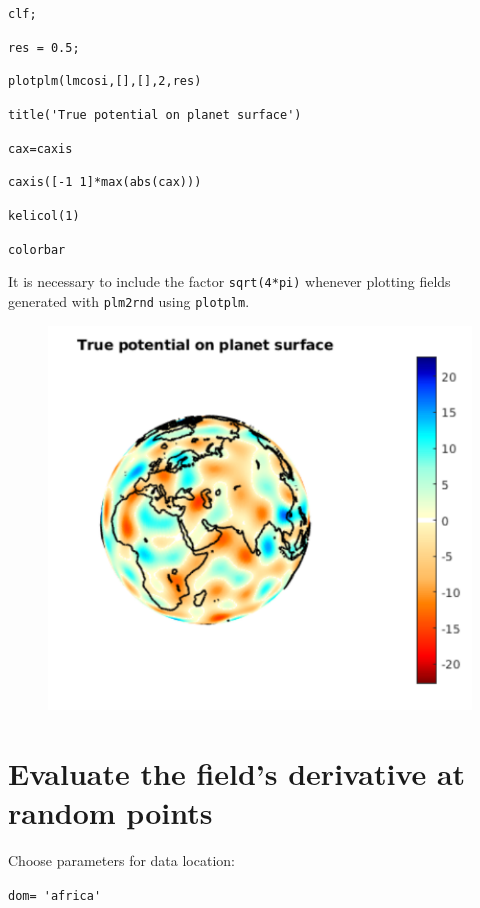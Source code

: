 \documentclass{article}
\begin{document}
\verb!clf; !

\verb!res = 0.5; !

\verb!plotplm(lmcosi,[],[],2,res)!

\verb!title('True potential on planet surface')!

\verb!cax=caxis!

\verb!caxis([-1 1]*max(abs(cax)))!

\verb!kelicol(1)!

\verb!colorbar !

\setlength{\parskip}{0.5cm plus4mm minus3mm}

It is necessary to include the factor \verb!sqrt(4*pi)! whenever plotting fields generated with \verb!plm2rnd! using \verb!plotplm!.

\begin{figure}[H]
\includegraphics[scale=.6]{true_potential}
\end{figure}

\section{Evaluate the field's derivative at random points}

Choose parameters for data location:

\vspace{3mm}

\setlength{\parskip}{.1mm}

\verb!dom= 'africa'!
\end{document}
